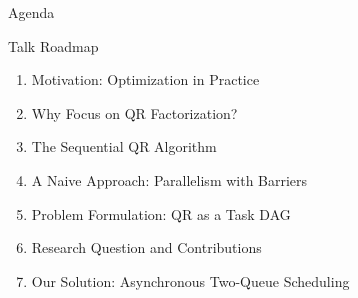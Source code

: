 \begin{frame}{Agenda}
	\pause 	
	\begin{block}{Talk Roadmap}
		\begin{enumerate}\setlength{\itemsep}{6pt}
		  \item Motivation: Optimization in Practice
		  \item Why Focus on QR Factorization?
		  \item The Sequential QR Algorithm
		  \item A Naive Approach: Parallelism with Barriers
		  \item Problem Formulation: QR as a Task DAG
		  \item Research Question and Contributions
		  \item Our Solution: Asynchronous Two-Queue Scheduling
		\end{enumerate}
	\end{block}
\end{frame}